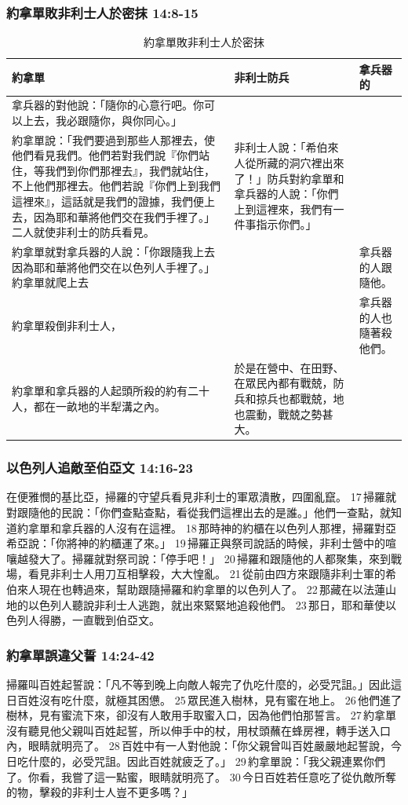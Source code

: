 \subsubsection{約拿單敗非利士人於密抹 14:8-15}
\begin{table}[H]
\centering 
\begin{tabular}{p{7.8cm}|p{}|p{2.3cm}}\hline\hline
約拿單&非利士防兵&拿兵器的\\\hline
拿兵器的對他說：「隨你的心意行吧。你可以上去，我必跟隨你，與你同心。」\\\hline
約拿單說：「我們要過到那些人那裡去，使他們看見我們。他們若對我們說『你們站住，等我們到你們那裡去』，我們就站住，不上他們那裡去。他們若說『你們上到我們這裡來』，這話就是我們的證據，我們便上去，因為耶和華將他們交在我們手裡了。」二人就使非利士的防兵看見。&非利士人說：「希伯來人從所藏的洞穴裡出來了！」防兵對約拿單和拿兵器的人說：「你們上到這裡來，我們有一件事指示你們。」&\\\hline
約拿單就對拿兵器的人說：「你跟隨我上去因為耶和華將他們交在以色列人手裡了。」約拿單就爬上去&&拿兵器的人跟隨他。\\\hline
約拿單殺倒非利士人，&&拿兵器的人也隨著殺他們。\\\hline
約拿單和拿兵器的人起頭所殺的約有二十人，都在一畝地的半犁溝之內。&於是在營中、在田野、在眾民內都有戰兢，防兵和掠兵也都戰兢，地也震動，戰兢之勢甚大。&\\\hline
\end{tabular}
\caption{約拿單敗非利士人於密抹}
\end{table}


\subsubsection{以色列人追敵至伯亞文 14:16-23}
在便雅憫的基比亞，掃羅的守望兵看見非利士的軍眾潰散，四圍亂竄。 17 掃羅就對跟隨他的民說：「你們查點查點，看從我們這裡出去的是誰。」他們一查點，就知道約拿單和拿兵器的人沒有在這裡。 18 那時神的約櫃在以色列人那裡，掃羅對亞希亞說：「你將神的約櫃運了來。」 19 掃羅正與祭司說話的時候，非利士營中的喧嚷越發大了。掃羅就對祭司說：「停手吧！」 20 掃羅和跟隨他的人都聚集，來到戰場，看見非利士人用刀互相擊殺，大大惶亂。 21 從前由四方來跟隨非利士軍的希伯來人現在也轉過來，幫助跟隨掃羅和約拿單的以色列人了。 22 那藏在以法蓮山地的以色列人聽說非利士人逃跑，就出來緊緊地追殺他們。 23 那日，耶和華使以色列人得勝，一直戰到伯亞文。

\subsubsection{約拿單誤違父誓 14:24-42}
掃羅叫百姓起誓說：「凡不等到晚上向敵人報完了仇吃什麼的，必受咒詛。」因此這日百姓沒有吃什麼，就極其困憊。 25 眾民進入樹林，見有蜜在地上。 26 他們進了樹林，見有蜜流下來，卻沒有人敢用手取蜜入口，因為他們怕那誓言。 27 約拿單沒有聽見他父親叫百姓起誓，所以伸手中的杖，用杖頭蘸在蜂房裡，轉手送入口內，眼睛就明亮了。 28 百姓中有一人對他說：「你父親曾叫百姓嚴嚴地起誓說，今日吃什麼的，必受咒詛。因此百姓就疲乏了。」 29 約拿單說：「我父親連累你們了。你看，我嘗了這一點蜜，眼睛就明亮了。 30 今日百姓若任意吃了從仇敵所奪的物，擊殺的非利士人豈不更多嗎？」

